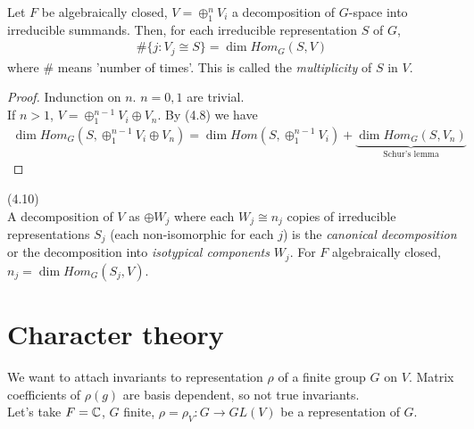 \documentclass[a4paper]{article}
\begin{document}
\begin{lemma}
Let $F$ be algebraically closed, $V=\oplus_1^n V_i$ a decomposition of $G$-space into irreducible summands. Then, for each irreducible representation $S$ of $G$,
\begin{equation*}
\begin{aligned}
\#\{j:V_j \cong S\} = \dim Hom_G(S,V)
\end{aligned}
\end{equation*}
where $\#$ means 'number of times'. This is called the \emph{multiplicity} of $S$ in $V$.
\begin{proof}
Indunction on $n$. $n=0,1$ are trivial.\\
If $n>1$, $V=\oplus_1^{n-1} V_i \oplus V_n$. By (4.8) we have
\begin{equation*}
\begin{aligned}
\dim Hom_G (S,\oplus_1^{n-1} V_i \oplus V_n) = \dim Hom(S,\oplus_1^{n-1} V_i) + \underbrace{\dim Hom_G (S,V_n)}_{\text{Schur's lemma}}
\end{aligned}
\end{equation*}
\end{proof}
\end{lemma}

\begin{defi} (4.10)\\
A decomposition of $V$ as $\oplus W_j$ where each $W_j \cong n_j$ copies of irreducible representations $S_j$ (each non-isomorphic for each $j$) is the \emph{canonical decomposition} or the decomposition into \emph{isotypical components} $W_j$. For $F$ algebraically closed, $n_j=\dim Hom_G(S_j,V)$.
\end{defi}

\newpage

\section{Character theory}

We want to attach invariants to representation $\rho$ of a finite group $G$ on $V$. Matrix coefficients of $\rho(g)$ are basis dependent, so not true invariants.\\
Let's take $F=\mathbb{C}$, $G$ finite, $\rho=\rho_V: G \to GL(V)$ be a representation of $G$.
\end{document}
